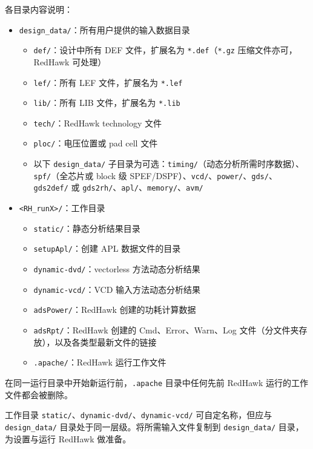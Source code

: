 各目录内容说明：
\begin{itemize}
  \item \texttt{design\_data/}：所有用户提供的输入数据目录
  \begin{itemize}
    \item \texttt{def/}：设计中所有 DEF 文件，扩展名为 \texttt{*.def}（\texttt{*.gz} 压缩文件亦可，RedHawk 可处理）
    \item \texttt{lef/}：所有 LEF 文件，扩展名为 \texttt{*.lef}
    \item \texttt{lib/}：所有 LIB 文件，扩展名为 \texttt{*.lib}
    \item \texttt{tech/}：RedHawk technology 文件
    \item \texttt{ploc/}：电压位置或 pad cell 文件
    \item 以下 \texttt{design\_data/} 子目录为可选：\texttt{timing/}（动态分析所需时序数据）、\texttt{spf/}（全芯片或 block 级 SPEF/DSPF）、\texttt{vcd/}、\texttt{power/}、\texttt{gds/}、\texttt{gds2def/} 或 \texttt{gds2rh/}、\texttt{apl/}、\texttt{memory/}、\texttt{avm/}
  \end{itemize}
  \item \texttt{<RH\_runX>/}：工作目录
  \begin{itemize}
    \item \texttt{static/}：静态分析结果目录
    \item \texttt{setupApl/}：创建 APL 数据文件的目录
    \item \texttt{dynamic-dvd/}：vectorless 方法动态分析结果
    \item \texttt{dynamic-vcd/}：VCD 输入方法动态分析结果
    \item \texttt{adsPower/}：RedHawk 创建的功耗计算数据
    \item \texttt{adsRpt/}：RedHawk 创建的 Cmd、Error、Warn、Log 文件（分文件夹存放），以及各类型最新文件的链接
    \item \texttt{.apache/}：RedHawk 运行工作文件
  \end{itemize}
\end{itemize}

\begin{noteBox}
在同一运行目录中开始新运行前，\texttt{.apache} 目录中任何先前 RedHawk 运行的工作文件都会被删除。
\end{noteBox}

工作目录 \texttt{static/}、\texttt{dynamic-dvd/}、\texttt{dynamic-vcd/} 可自定名称，但应与 \texttt{design\_data/} 目录处于同一层级。将所需输入文件复制到 \texttt{design\_data/} 目录，为设置与运行 RedHawk 做准备。

